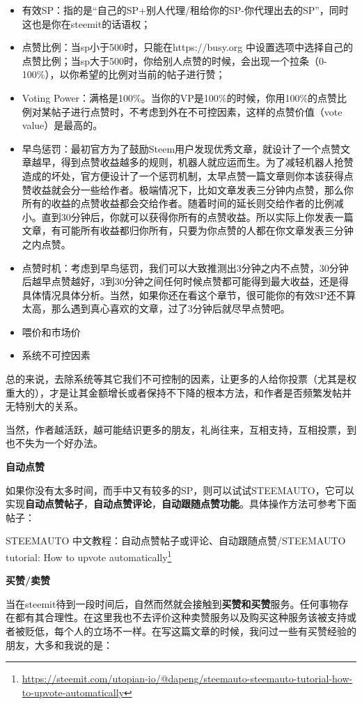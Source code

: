 \documentclass[]{ctexbook}
\renewcommand{\href}[2]{#2\footnote{\url{#1}}}
\begin{document}
\begin{itemize}
\item
  有效SP：指的是``自己的SP+别人代理/租给你的SP-你代理出去的SP''，同时这也是你在steemit的话语权；
\item
  点赞比例：当sp小于500时，只能在https://busy.org 中设置选项中选择自己的点赞比例；当sp大于500时，你给别人点赞的时候，会出现一个拉条（0-100\%），以你希望的比例对当前的帖子进行赞；
\item
  Voting Power：满格是100\%。当你的VP是100\%的时候，你用100\%的点赞比例对某帖子进行点赞时，不考虑到外在不可控因素，这样的点赞价值（vote value）是最高的。
\item
  早鸟惩罚：最初官方为了鼓励Steem用户发现优秀文章，就设计了一个点赞文章越早，得到点赞收益越多的规则，机器人就应运而生。为了减轻机器人抢赞造成的坏处，官方便设计了一个惩罚机制，太早点赞一篇文章则你本该获得点赞收益就会分一些给作者。极端情况下，比如文章发表三分钟内点赞，那么你所有的收益的点赞收益都会交给作者。随着时间的延长则交给作者的比例减小。直到30分钟后，你就可以获得你所有的点赞收益。所以实际上你发表一篇文章，有可能所有收益都归你所有，只要为你点赞的人都在你文章发表三分钟之内点赞。
\item
  点赞时机：考虑到早鸟惩罚，我们可以大致推测出3分钟之内不点赞，30分钟后越早点赞越好，3到30分钟之间任何时候点赞都可能得到最大收益，还是得具体情况具体分析。当然，如果你还在看这个章节，很可能你的有效SP还不算太高，那么遇到真心喜欢的文章，过了3分钟后就尽早点赞吧。
\item
  喂价和市场价
\item
  系统不可控因素
\end{itemize}

总的来说，去除系统等其它我们不可控制的因素，让更多的人给你投票（尤其是权重大的），才是让其金额增长或者保持不下降的根本方法，和作者是否频繁发帖并无特别大的关系。

当然，作者越活跃，越可能结识更多的朋友，礼尚往来，互相支持，互相投票，到也不失为一个好办法。

\textbf{自动点赞}

如果你没有太多时间，而手中又有较多的SP，则可以试试STEEMAUTO，它可以实现\textbf{自动点赞帖子}，\textbf{自动点赞评论}，\textbf{自动跟随点赞功能}。具体操作方法可参考下面帖子：

\href{https://steemit.com/utopian-io/@dapeng/steemauto-steemauto-tutorial-how-to-upvote-automatically}{STEEMAUTO 中文教程：自动点赞帖子或评论、自动跟随点赞/STEEMAUTO tutorial: How to upvote automatically}

\textbf{买赞/卖赞}

当在steemit待到一段时间后，自然而然就会接触到\textbf{买赞和买赞}服务。任何事物存在都有其合理性。在这里我也不去评价这种卖赞服务以及购买这种服务该被支持或者被贬低，每个人的立场不一样。在写这篇文章的时候，我问过一些有买赞经验的朋友，大多和我说的是：
\end{document}
